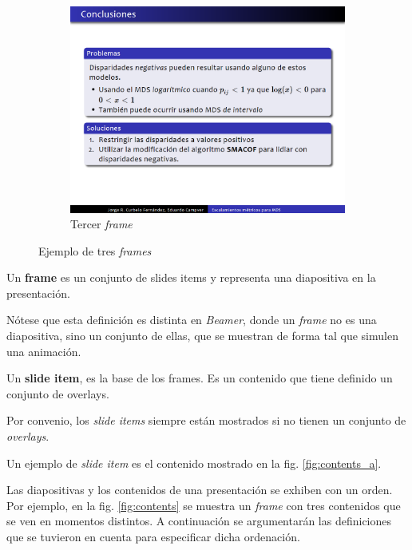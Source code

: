 \begin{figure}[tb]
\begin{subfigure}[b]{0.3\textwidth}
 				\includegraphics[width=\textwidth]{img/f3}
 				\caption{Tercer \textit{frame}}
 				\label{fig:frames_c}	
 			\end{subfigure}			 			
 			\caption{Ejemplo de tres \textit{frames}}
 			\label{fig:frames}
 		\end{figure}

 		\begin{definition}
 		\label{def:frame}
			Un \textnormal{\textbf{frame}} es un conjunto de \textnormal{slides items} y representa una diapositiva en la presentación. 
 		\end{definition}

 		Nótese que esta definición es distinta en \textit{Beamer}, donde un \textit{frame} no es una diapositiva, sino un conjunto de ellas, que se muestran de forma tal que simulen una animación.

 		\begin{definition}
 		\label{def:slide_item}
 			Un \textnormal{\textbf{slide item}}, es la base de los \textnormal{frames}. Es un contenido que tiene definido un conjunto de \textnormal{overlays}. 
 		\end{definition}

 		Por convenio, los \textit{slide items} siempre están mostrados si no tienen un conjunto de \textit{overlays}.

		Un ejemplo de \textit{slide item} es el contenido mostrado en la fig. \ref{fig:contents_a}.

		Las diapositivas y los contenidos de una presentación se exhiben con un orden. Por ejemplo, en la fig. \ref{fig:contents} se muestra un \textit{frame} con tres contenidos que se ven en momentos distintos. A continuación se argumentarán las definiciones que se tuvieron en cuenta para especificar dicha ordenación.

